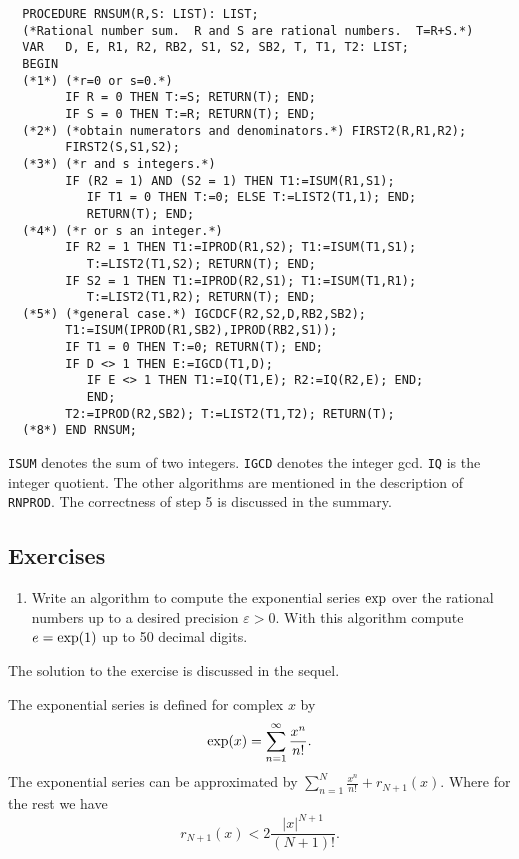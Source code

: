 {\footnotesize
\begin{verbatim}
  PROCEDURE RNSUM(R,S: LIST): LIST;
  (*Rational number sum.  R and S are rational numbers.  T=R+S.*)
  VAR   D, E, R1, R2, RB2, S1, S2, SB2, T, T1, T2: LIST;
  BEGIN
  (*1*) (*r=0 or s=0.*)
        IF R = 0 THEN T:=S; RETURN(T); END;
        IF S = 0 THEN T:=R; RETURN(T); END;
  (*2*) (*obtain numerators and denominators.*) FIRST2(R,R1,R2);
        FIRST2(S,S1,S2);
  (*3*) (*r and s integers.*)
        IF (R2 = 1) AND (S2 = 1) THEN T1:=ISUM(R1,S1);
           IF T1 = 0 THEN T:=0; ELSE T:=LIST2(T1,1); END;
           RETURN(T); END;
  (*4*) (*r or s an integer.*)
        IF R2 = 1 THEN T1:=IPROD(R1,S2); T1:=ISUM(T1,S1);
           T:=LIST2(T1,S2); RETURN(T); END;
        IF S2 = 1 THEN T1:=IPROD(R2,S1); T1:=ISUM(T1,R1);
           T:=LIST2(T1,R2); RETURN(T); END;
  (*5*) (*general case.*) IGCDCF(R2,S2,D,RB2,SB2);
        T1:=ISUM(IPROD(R1,SB2),IPROD(RB2,S1));
        IF T1 = 0 THEN T:=0; RETURN(T); END;
        IF D <> 1 THEN E:=IGCD(T1,D);
           IF E <> 1 THEN T1:=IQ(T1,E); R2:=IQ(R2,E); END;
           END;
        T2:=IPROD(R2,SB2); T:=LIST2(T1,T2); RETURN(T);
  (*8*) END RNSUM;
\end{verbatim}
}
\verb/ISUM/ denotes the sum of two integers.
\verb/IGCD/ denotes the integer gcd.
\verb/IQ/ is the integer quotient. The 
other algorithms are mentioned in the 
description of \verb/RNPROD/.
The correctness of step 5 is discussed in the summary.


\subsection{Exercises}

\begin{enumerate}
\item Write an algorithm to compute the 
      exponential series $\rm exp$ over the rational numbers
      up to a desired precision $\varepsilon >0$.
      With this algorithm compute $e = {\rm exp}(1)$ up to 50 
      decimal digits.
\end{enumerate}

The solution to the exercise is discussed in the sequel.

The exponential series is defined for complex $x$ by
\begin{displaymath}
      {\rm exp}(x) = \sum_{n=1}^{\infty} \frac{x^n}{n !}.
\end{displaymath}
The exponential series can be approximated by
$\sum_{n=1}^{N} \frac{x^n}{n !} + r_{N+1}(x)$.
Where for the rest we have
\begin{displaymath}
      r_{N+1}(x) < 2 \frac{\vert x \vert^{N+1}}{(N+1) !}.
\end{displaymath}

